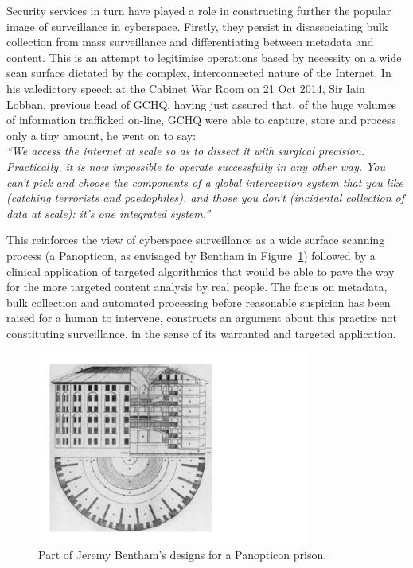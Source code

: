 \documentclass{llncs}
\begin{document}
Security services in turn have played a role in constructing further the popular image of surveillance in cyberspace. Firstly, they persist in disassociating bulk collection from mass surveillance and differentiating between metadata and content. This is an attempt to legitimise operations based by necessity on a wide scan surface dictated by the complex, interconnected nature of the Internet. In his valedictory speech at the Cabinet War Room on 21 Oct 2014, Sir Iain Lobban, previous head of GCHQ, having just assured that, of the huge volumes of information trafficked on-line, GCHQ were able to capture, store and process only a tiny amount, he went on to say:\\
\emph{``We access the internet at scale so as to dissect it with surgical precision. Practically, it is now impossible to operate successfully in any other way. You can't pick and choose the components of a global interception system that you like (catching terrorists and paedophiles), and those you don't (incidental collection of data at scale): it's one integrated system.''}~\cite{Lobban}

This reinforces the view of cyberspace surveillance as a wide surface scanning process (a Panopticon, as envisaged by Bentham in Figure~\ref{fig:Panopticon}) followed by a clinical application of targeted algorithmics that would be able to pave the way for the more targeted content analysis by real people. The focus on metadata, bulk collection and automated processing before reasonable suspicion has been raised for a human to intervene, constructs an argument about this practice not constituting surveillance, in the sense of its warranted and targeted application.

\begin{figure}[ht]
\begin{center}
\includegraphics[width=0.8\textwidth]{images/fig2}
\caption{Part of Jeremy Bentham's designs for a Panopticon prison.}
\label{fig:Panopticon}
\end{center}
\end{figure}
\end{document}

